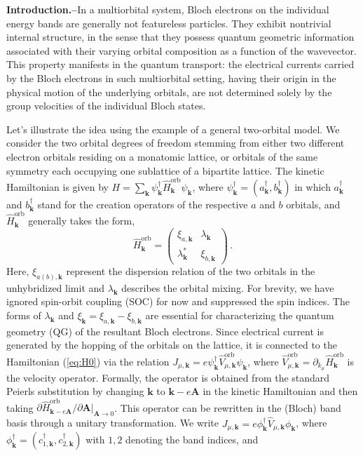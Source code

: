 \documentclass[prl,floatfix,twocolumn,showpacs,amsmath,superscriptaddress]{revtex4-2}
\newcommand{\ra}{\rightarrow}
\renewcommand{\vec}[1]{\mathbf{#1}}
\newcommand{\vk}{{\vec{k}}}
\begin{document}
{\bf Introduction.--}In a multiorbital system, Bloch electrons on the individual energy bands are generally not featureless particles. They exhibit nontrivial internal structure, in the sense that they possess quantum geometric information associated with their varying orbital composition as a function of the wavevector. This property manifests in the quantum transport: the electrical currents carried by the Bloch electrons in such multiorbital setting, having their origin in the physical motion of the underlying orbitals, are not determined solely by the group velocities of the individual Bloch states.

Let's illustrate the idea using the example of a general two-orbital model. We consider the two orbital degrees of freedom stemming from either two different electron orbitals residing on a monatomic lattice, or orbitals of the same symmetry each occupying one sublattice of a bipartite lattice. The kinetic Hamiltonian is given by $H= \sum_\vk \psi_{\vk}^\dagger \hat{H}^\text{orb}_\vk \psi_\vk$, where $\psi^\dagger_\vk = (a^\dagger_{\vk},b^\dagger_{\vk})$ in which $a^\dagger_{\vk}$ and $b^\dagger_{\vk}$ stand for the creation operators of the respective $a$ and $b$ orbitals, and $\hat{H}^\text{orb}_\vk$ generally takes the form, 
\begin{equation}
	\hat{H}^\text{orb}_\vk = \begin{pmatrix}
		\xi_{a,\vk}  &  \lambda_\vk \\
		\lambda_\vk^\ast & \xi_{b,\vk} 
	\end{pmatrix} \,.
	\label{eq:H0}
\end{equation}
Here, $\xi_{a(b),\vk}$ represent the dispersion relation of the two orbitals in the unhybridized limit and $\lambda_\vk$ describes the orbital mixing. For brevity, we have ignored spin-orbit coupling (SOC) for now and suppressed the spin indices. The forms of $\lambda_\vk$ and $\xi_{\vk}=\xi_{a,\vk}-\xi_{b,\vk}$ are essential for characterizing the quantum geometry (QG) of the resultant Bloch electrons. Since electrical current is generated by the hopping of the orbitals on the lattice, it is connected to the Hamiltonian (\ref{eq:H0}) via the relation $J_{\mu,\vk} =e \psi_\vk^\dagger \hat{V}^\text{orb}_{\mu,\vk} \psi_\vk$, where $\hat{V}^\text{orb}_{\mu,\vk}= \partial_{k_\mu}\hat{H}^\text{orb}_\vk$ is the velocity operator. Formally, the operator is obtained from the standard Peierls substitution by changing $\vk$ to $\vk-e \vec{A}$ in the kinetic Hamiltonian and then taking $\partial \hat{H}^\text{orb}_{\vk-e\vec{A}}/\partial \vec{A}|_{\vec{A}\ra 0}$. This operator can be rewritten in the (Bloch) band basis through a unitary transformation. We write $J_{\mu,\vk} =e \phi_\vk^\dagger \hat{V}_{\mu,\vk} \phi_\vk$, where $\phi_\vk^\dagger=(c_{1,\vk}^\dagger,c_{2,\vk}^\dagger)$ with $1,2$ denoting the band indices, and 
\end{document}
